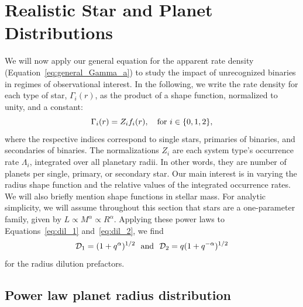 \documentclass[12pt,modern]{aastex61}
\begin{document}

\section{Realistic Star and Planet Distributions}
\label{sec:more_complicated}

We will now apply our general equation for the apparent rate density
(Equation~\ref{eq:general_Gamma_a}) to study the impact of
unrecognized binaries in regimes of observational interest.  In the
following, we write the rate density for each type of star,
$\Gamma_i(r)$, as the product of a shape function, normalized to
unity, and a constant:
\begin{equation}
    \Gamma_i(r) = Z_i f_i(r), \quad {\rm for\ }i\in\{0,1,2\},
\end{equation}
where the respective indices correspond to single stars, primaries of
binaries, and secondaries of binaries.  The normalizations $Z_i$ are
each system type's occurrence rate $\Lambda_i$, integrated over all
planetary radii. In other words, they are number of planets per
single, primary, or secondary star.  Our main interest is in
varying the radius shape function and the relative values of the
integrated occurrence rates. We will also briefly mention shape
functions in stellar mass.  For analytic simplicity, we will assume
throughout this section that stars are a one-parameter family, given
by $L \propto M^\alpha \propto R^\alpha$.  Applying these power laws
to Equations~\ref{eq:dil_1} and~\ref{eq:dil_2}, we find
\begin{equation}
  \mathcal{D}_1
  =  (1+q^\alpha)^{1/2}~~{\rm and}~~\mathcal{D}_2
  = q(1+q^{-\alpha})^{1/2}
\end{equation}
for the radius dilution prefactors.

\subsection{Power law planet radius distribution}
\label{sec:model_2}
\end{document}
